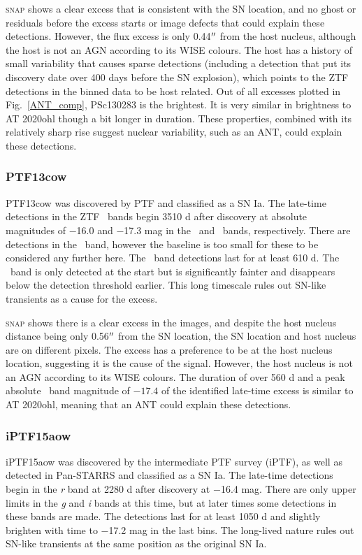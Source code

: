 \documentclass[a4paper,oneside,12pt, class=Latex/Classes/PhDthesisPSnPDF, crop=false]{standalone}
\begin{document}
\textsc{snap} shows a clear excess that is consistent with the SN location, and no ghost or residuals before the excess starts  or image defects that could explain these detections. However, the flux excess is only 0.44$^{\prime\prime}$ from the host nucleus, although the host is not an AGN according to its WISE colours. The host has a history of small variability that causes sparse detections (including a detection that put its discovery date over 400 days before the SN explosion), which points to the ZTF detections in the binned data to be host related. Out of all excesses plotted in Fig.~\ref{ANT_comp}, PSc130283 is the brightest. It is very similar in brightness to AT 2020ohl though a bit longer in duration. These properties, combined with its relatively sharp rise suggest nuclear variability, such as an ANT, could explain these detections.


\subsubsection*{PTF13cow}
PTF13cow was discovered by PTF and classified as a SN Ia. The late-time detections in the ZTF \ztfg\ztfr\ztfi\ bands begin 3510 d after discovery at absolute magnitudes of $-$16.0 and $-$17.3 mag in the \ztfg\ and \ztfr\ bands, respectively. There are detections in the \ztfi\ band, however the baseline is too small for these to be considered any further here. The \ztfr\ band detections last for at least 610 d. The \ztfg\ band is only detected at the start but is significantly fainter and disappears below the detection threshold earlier. This long timescale rules out SN-like transients as a cause for the excess.

\textsc{snap} shows there is a clear excess in the images, and despite the host nucleus distance being only 0.56$^{\prime\prime}$ from the SN location, the SN location and host nucleus are on different pixels. The excess has a preference to be at the host nucleus location, suggesting it is the cause of the signal. However, the host nucleus is not an AGN according to its WISE colours. The duration of over 560 d and a peak absolute \ztfr\ band magnitude of $-17.4$ of the identified late-time excess is similar to AT 2020ohl, meaning that an ANT could explain these detections.




\subsubsection*{iPTF15aow}
iPTF15aow was discovered by the intermediate PTF survey (iPTF), as well as detected in Pan-STARRS and classified as a SN Ia. The late-time detections begin in the \textit{r} band at 2280 d after discovery at $-$16.4 mag. There are only upper limits in the \textit{g} and \textit{i} bands at this time, but at later times some detections in these bands are made. The detections last for at least 1050 d and slightly brighten with time to $-$17.2 mag in the last bins. The long-lived nature rules out SN-like transients at the same position as the original SN Ia. 
\end{document}
